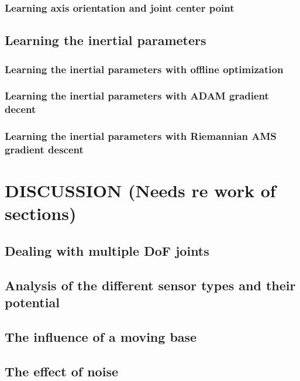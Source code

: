 \documentclass{article}
\begin{document}
\subsubsection{Learning axis orientation and joint center point }
\subsection{Learning the inertial parameters}
\subsubsection{Learning the inertial parameters with offline optimization}
\subsubsection{Learning the inertial parameters with ADAM gradient decent}
\subsubsection{Learning the inertial parameters with Riemannian AMS gradient descent}

\section{DISCUSSION (Needs re work of sections)}
\subsection{Dealing with multiple DoF joints}
\subsection{Analysis of the different sensor types and their potential}
\subsection{The influence of a moving base}
\subsection{The effect of noise}
\end{document}
